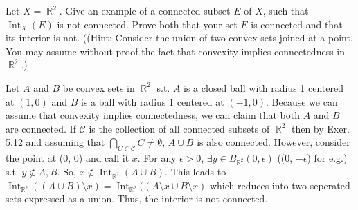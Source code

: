 \documentclass[12pt,letterpaper,boxed]{hmcpset}
\DeclareMathOperator{\Int}{Int}
\DeclareMathOperator{\R}{\mathbb{R}}
\begin{document}
\begin{problem}[Exercise 5.13]
Let $X = \R^{2}$. Give an example of a connected subset $E$ of $X$, such that $\Int_X(E)$ is not connected. Prove both that your set $E$ is connected and that its interior is not. ((Hint: Consider the
union of two convex sets joined at a point. You may assume without proof the fact that convexity implies
connectedness in $\R^{2}$.)
\end{problem}

\begin{solution}
Let $A$ and $B$ be convex sets in $\R^{2}$ s.t. $A$ is a closed ball with radius 1 centered at $(1, 0)$ and $B$ is a ball with radius 1 centered at $(-1, 0)$. Because we can assume that convexity implies connectedness, we can claim that both $A$ and $B$ are connected. If $\mathcal{C}$ is the collection of all connected subsets of $\R^{2}$ then by Exer. 5.12 and assuming that $\bigcap_{C \in \mathcal{C}} C \neq \emptyset$, $A \cup B$ is also connected. However, consider the point at (0, 0) and call it $x$. For any $\epsilon > 0$, $\exists y \in B_{\R^{2}}(0 , \epsilon)$ ((0, $-\epsilon$) for e.g.) s.t. $y \notin A, B.$ So, $x \notin \Int_{\R^{2}}(A \cup B)$. This leads to $\Int_{\R^{2}}((A \cup B)\setminus x)= \Int_{\R^{2}}((A\setminus x \cup B\setminus x)$ which reduces into two seperated sets expressed as a union. Thus, the interior is not connected.
\end{solution}
\end{document}
